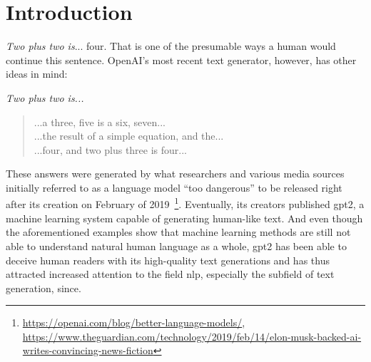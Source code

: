 \section{Introduction}
\label{ch:introduction}

\textit{Two plus two is}... four. That is one of the presumable ways a human would continue this sentence. OpenAI's most recent text generator, however, has other ideas in mind:

\textit{Two plus two is...}
\begin{quote}
	...a three, five is a six, seven... \\
	...the result of a simple equation, and the... \\
	...four, and two plus three is four...
\end{quote}
These answers were generated by what researchers and various media sources initially referred to as a language model ``too dangerous'' to be released right after its creation on February of 2019~\footnote{\url{https://openai.com/blog/better-language-models/}, \url{https://www.theguardian.com/technology/2019/feb/14/elon-musk-backed-ai-writes-convincing-news-fiction}}. Eventually, its creators published \gls{gpt2}, a machine learning system capable of generating human-like text. And even though the aforementioned examples show that machine learning methods are still not able to understand natural human language as a whole, \gls{gpt2} has been able to deceive human readers with its high-quality text generations and has thus attracted increased attention to the field \gls{nlp}, especially the subfield of text generation, since.

